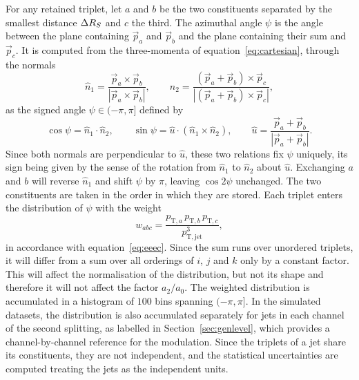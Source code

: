 For any retained triplet, let $a$ and $b$ be the two constituents separated by the
smallest distance $\Delta R_S$ and $c$ the third. The azimuthal angle $\psi$ is the
angle between the plane containing $\vec{p}_a$ and $\vec{p}_b$ and the plane
containing their sum and $\vec{p}_c$. It is computed from the three-momenta of
equation~\eqref{eq:cartesian}, through the normals
%
\begin{equation}
  \hat{n}_1 = \frac{\vec{p}_a \times \vec{p}_b}{|\vec{p}_a \times \vec{p}_b|},
  \qquad
  \hat{n}_2 = \frac{(\vec{p}_a + \vec{p}_b) \times \vec{p}_c}
                   {|(\vec{p}_a + \vec{p}_b) \times \vec{p}_c|},
  \label{eq:eeec-normals}
\end{equation}
%
as the signed angle $\psi\in(-\pi,\pi]$ defined by
\begin{equation}
  \cos\psi = \hat{n}_1\cdot\hat{n}_2,
  \qquad
  \sin\psi = \hat{u}\cdot(\hat{n}_1\times\hat{n}_2),
  \qquad
  \hat{u} = \frac{\vec{p}_a+\vec{p}_b}
                 {|\vec{p}_a+\vec{p}_b|}.
  \label{eq:eeec-psi}
\end{equation}
Since both normals are perpendicular to $\hat{u}$, these two
relations fix $\psi$ uniquely, its sign being given by the sense
of the rotation from $\hat{n}_1$ to $\hat{n}_2$ about $\hat{u}$. Exchanging $a$ and $b$
will reverse $\hat{n}_1$ and shift $\psi$ by $\pi$, leaving $\cos 2\psi$ unchanged.
The two constituents are taken in the order in which they are stored. Each triplet
enters the distribution of $\psi$ with the weight
%
\begin{equation}
  w_{abc} = \frac{p_{\mathrm{T},a}\,p_{\mathrm{T},b}\,p_{\mathrm{T},c}}
                 {p_{\mathrm{T},\text{jet}}^{3}} ,
  \label{eq:eeec-weight}
\end{equation}
%
in accordance with equation~\eqref{eq:eeec}. Since the sum runs over unordered
triplets, it will differ from a sum over all orderings of $i$, $j$ and $k$ only by
a constant factor. This will affect the normalisation of the distribution, but not
its shape and therefore it will not affect the factor $a_2/a_0$. The weighted
distribution is accumulated in a histogram of $100$ bins spanning $(-\pi,\pi]$. In
the simulated datasets, the distribution is also accumulated separately for jets in
each channel of the second splitting, as labelled in Section~\ref{sec:genlevel},
which provides a channel-by-channel reference for the modulation. Since the
triplets of a jet share its constituents, they are not independent, and the
statistical uncertainties are computed treating the jets as the independent units.

